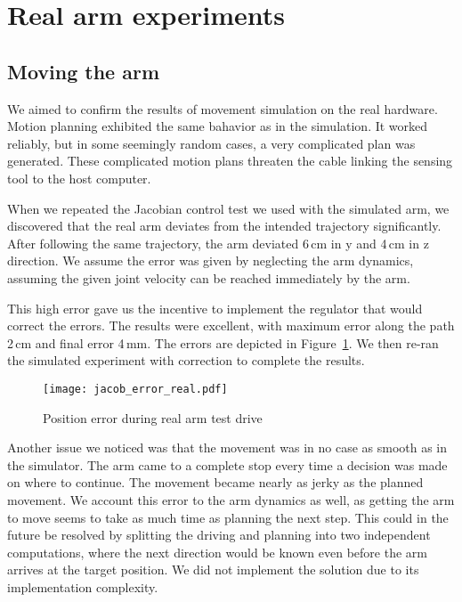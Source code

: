 \documentclass[buriama8_dp.tex]{subfiles}
\begin{document}
\section{Real arm experiments}
\label{sec:exp_real_arm}

\subsection{Moving the arm}
\label{subsec:exp_move_real}

We aimed to confirm the results of movement simulation on the real hardware. Motion planning exhibited the same bahavior as in the simulation. It worked reliably, but in some seemingly random cases, a very complicated plan was generated. These complicated motion plans threaten the cable linking the sensing tool to the host computer.

When we repeated the Jacobian control test we used with the simulated arm, we discovered that the real arm deviates from the intended trajectory significantly. After following the same trajectory, the arm deviated 6\,cm in \m y and 4\,cm in \m z direction. We assume the error was given by neglecting the arm dynamics, assuming the given joint velocity can be reached immediately by the arm.

This high error gave us the incentive to implement the regulator that would correct the errors. The results were excellent, with maximum error along the path 2\,cm and final error 4\,mm. The errors are depicted in Figure~\ref{fig:err_jac_real}. We then re-ran the simulated experiment with correction to complete the results.

\begin{figure}[ht]
  \centering
  \texttt{[image: jacob\_error\_real.pdf]}
  \caption{Position error during real arm test drive}
  \label{fig:err_jac_real}
\end{figure}

Another issue we noticed was that the movement was in no case as smooth as in the simulator. The arm came to a complete stop every time a decision was made on where to continue. The movement became nearly as jerky as the planned movement. We account this error to the arm dynamics as well, as getting the arm to move seems to take as much time as planning the next step. This could in the future be resolved by splitting the driving and planning into two independent computations, where the next direction would be known even before the arm arrives at the target position. We did not implement the solution due to its implementation complexity.
\end{document}

